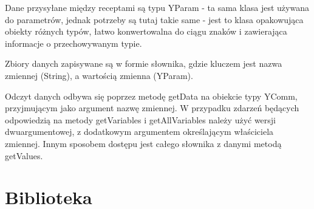 \documentclass[11pt,a4paper,polish,thesis]{dcsbook}
\begin{document}
Dane przysyłane między receptami są typu YParam - ta sama klasa jest używana do parametrów, jednak potrzeby są tutaj takie same - jest to klasa opakowująca obiekty różnych typów, łatwo konwertowalna do ciągu znaków i zawierająca informacje o przechowywanym typie. 

Zbiory danych zapisywane są w formie słownika, gdzie kluczem jest nazwa zmiennej (String), a wartością zmienna (YParam). 

Odczyt danych odbywa się poprzez metodę getData na obiekcie typy YComm, przyjmującym jako argument nazwę zmiennej. W przypadku zdarzeń będących odpowiedzią na metody getVariables i getAllVariables należy użyć wersji dwuargumentowej, z dodatkowym argumentem określającym właściciela zmiennej. Innym sposobem dostępu jest całego słownika z danymi metodą getValues.
 
\section{Biblioteka}
\end{document}
